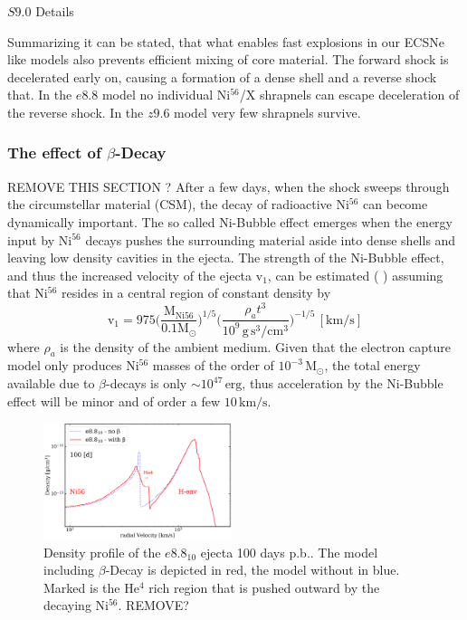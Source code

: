 \documentclass[fleqn,usenatbib]{mnras}
\newcommand{\helium}{$\mathrm{He^{4}}$\xspace}
\newcommand{\nickel}{$\mathrm{Ni^{56}}$\xspace}
\newcommand{\tracer}{$\mathrm{X}$\xspace}
\newcommand{\COM}[1]{{\color{orange}#1}}
\begin{document}
\COM{$S9.0$ Details}

Summarizing it can be stated, that what enables fast explosions in our ECSNe like models also prevents efficient mixing of core material. The forward shock is decelerated early on, causing a formation of a dense shell and a reverse shock that. In the $e8.8$ model no individual \nickel/\tracer shrapnels can escape deceleration of the reverse shock. In the $z9.6$ model very few shrapnels survive. 

\subsubsection{The effect of $\beta$-Decay}
\COM{REMOVE THIS SECTION ?}
After a few days, when the shock sweeps through the circumstellar material (CSM), the decay of radioactive \nickel can become dynamically important. The so called Ni-Bubble effect emerges when the energy input by \nickel decays pushes the surrounding material aside into dense shells and leaving low density cavities in the ejecta. The strength of the Ni-Bubble effect, and thus the increased velocity of the ejecta $\mathrm{v}_1$,  can be estimated (\cite{Chevalier2005} ) assuming that \nickel resides in a central region of constant density by
\begin{equation}
\mathrm{v_1} = 975\Big(\frac{\mathrm{M_{Ni56}}}{0.1\mathrm{M_{\odot}}} \Big)^{1/5} \Big( \frac{\rho_a t^3} {10^9 \mathrm{\,g\,s^3/cm^3}}\Big)^{-1/5}\, \mathrm{[km/s]}
\end{equation}
where $\rho_a$ is the density of the ambient medium. Given that the electron capture model only produces \nickel masses of the order of $10^{-3}\,\mathrm{M_{\odot}}$, the total energy available due to $\beta$-decays is only $\sim 10^{47}\,\mathrm{erg}$, thus acceleration by the Ni-Bubble effect will be minor and of order a few $10\,\mathrm{km/s}$.

\begin{figure}
 \label{fig:e8_beta}
 \centering
 \includegraphics[width=0.49\textwidth]{./pic/e8_10_beta_nobeta_den_vs_vr.pdf}
 \caption{Density profile of the $e8.8_{10}$ ejecta 100 days p.b.. The model including $\beta$-Decay is depicted in red, the model without in blue. Marked is the \helium rich region that is pushed outward by the decaying \nickel. \COM{REMOVE?} }
\end{figure}
\end{document}
